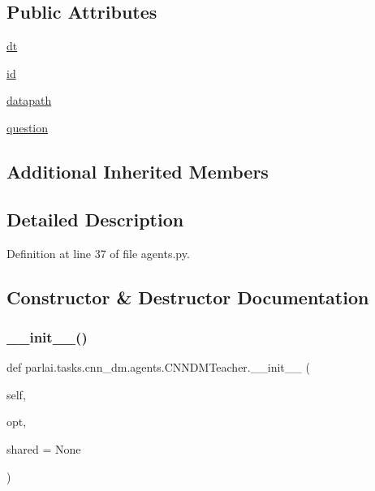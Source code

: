 \subsection*{Public Attributes}
\begin{DoxyCompactItemize}
\item 
\hyperlink{classparlai_1_1tasks_1_1cnn__dm_1_1agents_1_1CNNDMTeacher_a53c9a947f820813c147c427ee932110b}{dt}
\item 
\hyperlink{classparlai_1_1tasks_1_1cnn__dm_1_1agents_1_1CNNDMTeacher_a0057b9cfef0a8a164db0b795980c41e1}{id}
\item 
\hyperlink{classparlai_1_1tasks_1_1cnn__dm_1_1agents_1_1CNNDMTeacher_ac5bd6f991445d012def0d4891084ed06}{datapath}
\item 
\hyperlink{classparlai_1_1tasks_1_1cnn__dm_1_1agents_1_1CNNDMTeacher_adabc9a81947bb5e85f132fc7676958e6}{question}
\end{DoxyCompactItemize}
\subsection*{Additional Inherited Members}


\subsection{Detailed Description}


Definition at line 37 of file agents.\+py.



\subsection{Constructor \& Destructor Documentation}
\mbox{\label{classparlai_1_1tasks_1_1cnn__dm_1_1agents_1_1CNNDMTeacher_a2a874e26d57c9f9c399a757f670f9133}} 
\subsubsection{\texorpdfstring{\+\_\+\+\_\+init\+\_\+\+\_\+()}{\_\_init\_\_()}}
{\footnotesize\ttfamily def parlai.\+tasks.\+cnn\+\_\+dm.\+agents.\+C\+N\+N\+D\+M\+Teacher.\+\_\+\+\_\+init\+\_\+\+\_\+ (\begin{DoxyParamCaption}\item[{}]{self,  }\item[{}]{opt,  }\item[{}]{shared = {\ttfamily None} }\end{DoxyParamCaption})}



